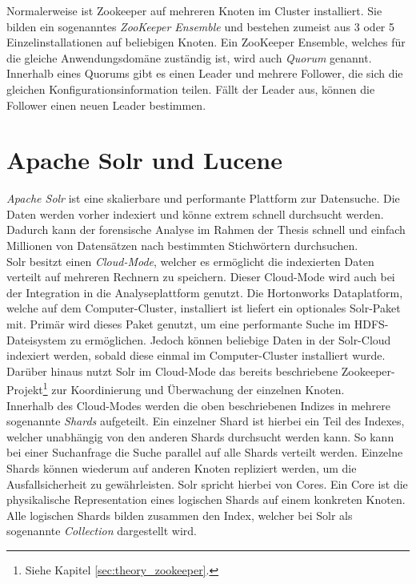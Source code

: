 \noindent
Normalerweise ist Zookeeper auf mehreren Knoten im Cluster installiert. Sie bilden ein sogenanntes \textit{ZooKeeper Ensemble} und bestehen zumeist aus 3 oder 5 Einzelinstallationen auf beliebigen Knoten. Ein ZooKeeper Ensemble, welches für die gleiche Anwendungsdomäne zuständig ist, wird auch \textit{Quorum} genannt. Innerhalb eines Quorums gibt es einen Leader und mehrere Follower, die sich die gleichen Konfigurationsinformation teilen. Fällt der Leader aus, können die Follower einen neuen Leader bestimmen.\cite{zookeeper_essentials}\\

\section{Apache Solr und Lucene}
\label{sec:theory_solr}
\textit{Apache Solr\texttrademark\thinspace} ist eine skalierbare und performante Plattform zur Datensuche. Die Daten werden vorher indexiert und könne extrem schnell durchsucht werden.\cite{solr_search}\\
Dadurch kann der forensische Analyse im Rahmen der Thesis schnell und einfach Millionen von Datensätzen nach bestimmten Stichwörtern durchsuchen.\\

\noindent
Solr besitzt einen \textit{Cloud-Mode}, welcher es ermöglicht die indexierten Daten verteilt auf mehreren Rechnern zu speichern. Dieser Cloud-Mode wird auch bei der Integration in die Analyseplattform genutzt. Die Hortonworks Dataplatform, welche auf dem Computer-Cluster, installiert ist liefert ein optionales Solr-Paket mit. Primär wird dieses Paket genutzt, um eine performante Suche im HDFS-Dateisystem zu ermöglichen. Jedoch können beliebige Daten in der Solr-Cloud indexiert werden, sobald diese einmal im Computer-Cluster installiert wurde. Darüber hinaus nutzt Solr im Cloud-Mode das bereits beschriebene Zookeeper-Projekt\footnote{Siehe Kapitel \ref{sec:theory_zookeeper}.} zur Koordinierung und Überwachung der einzelnen Knoten.\\
Innerhalb des Cloud-Modes werden die oben beschriebenen Indizes in mehrere sogenannte \textit{Shards} aufgeteilt. Ein einzelner Shard ist hierbei ein Teil des Indexes, welcher unabhängig von den anderen Shards durchsucht werden kann. So kann bei einer Suchanfrage die Suche parallel auf alle Shards verteilt werden. Einzelne Shards können wiederum auf anderen Knoten repliziert werden, um die Ausfallsicherheit zu gewährleisten. Solr spricht hierbei von Cores. Ein Core ist die physikalische Representation eines logischen Shards auf einem konkreten Knoten. Alle logischen Shards bilden zusammen den Index, welcher bei Solr als sogenannte \textit{Collection} dargestellt wird.\cite{solr_cloud_scaling}\\

